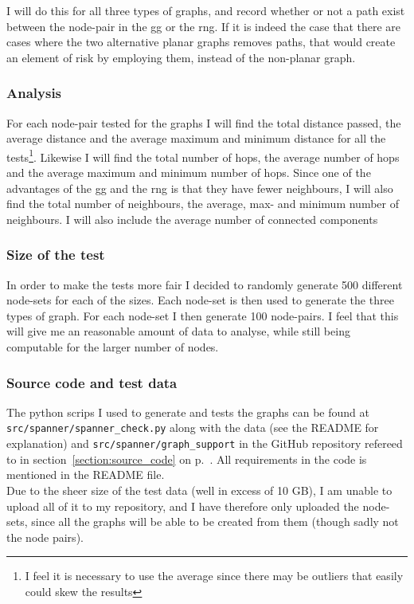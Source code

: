 I will do this for all three types of graphs, and record whether or not a path exist between the node-pair in the \ac{gg} or the \ac{rng}. If it is indeed the case that there are cases where the two alternative planar graphs removes paths, that would create an element of risk by employing them, instead of the non-planar graph.

\subsubsection{Analysis}

For each node-pair tested for the graphs I will find the total distance passed, the average distance and the average maximum and minimum distance for all the tests\footnote{I feel it is necessary to use the average since there may be outliers that easily could skew the results}. Likewise I will find the total number of hops, the average number of hops and the average maximum and minimum number of hops. Since one of the advantages of the \ac{gg} and the \ac{rng} is that they have fewer neighbours, I will also find the total number of neighbours, the average, max- and minimum number of neighbours. I will also include the average number of connected components 


\subsubsection{Size of the test}
In order to make the tests more fair I decided to randomly generate 500 different node-sets for each of the sizes. Each node-set is then used to generate the three types of graph. For each node-set I then generate 100 node-pairs. I feel that this will give me an reasonable amount of data to analyse, while still being computable for the larger number of nodes.


\subsubsection{Source code and test data}
The python scrips I used to generate and tests the graphs can be found at \texttt{src/spanner/spanner\_check.py} along with the data (see the README for explanation) and \texttt{src/spanner/graph\_support} in the GitHub repository refereed to in section~\ref{section:source_code} on p.~\pageref{section:source_code}. All requirements in the code is mentioned in the README file.\\

Due to the sheer size of the test data (well in excess of 10 GB), I am unable to upload all of it to my repository, and I have therefore only uploaded the node-sets, since all the graphs will be able to be created from them (though sadly not the node pairs).
